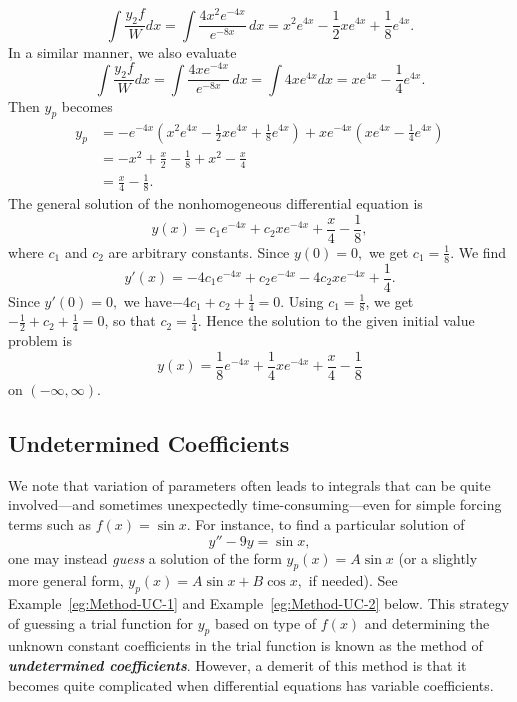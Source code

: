 \begin{solution}
\[
\int \frac{y_2 f}{W} dx= \int \frac{4x^2 e^{-4x}}{e^{-8x}}\, dx =x^2 e^{4x} - \frac{1}{2} x e^{4x} + \frac{1}{8} e^{4x}.\]
	In a similar manner, we also evaluate
		\[
		 \int \frac{y_2 f}{W} dx=\int \frac{4x e^{-4x}}{e^{-8x}}\, dx= \int 4x e^{4x} dx 
		= x e^{4x} - \frac{1}{4} e^{4x}.
		\]	
Then  \( y_p \) becomes
		\[\begin{aligned}
		y_p &= -e^{-4x} \left( x^2 e^{4x} - \frac{1}{2} x e^{4x} + \frac{1}{8} e^{4x} \right)
		+ x e^{-4x}\left( x e^{4x} - \frac{1}{4} e^{4x} \right)\\
		&=- x^2 + \frac{x}{2}  - \frac{1}{8} + x^2 - \frac{x}{4}\\
		 &=\frac{x}{4}  - \frac{1}{8}.
		\end{aligned}
		\]
The general solution of the nonhomogeneous differential equation  is
		\[
		y(x) = c_1 e^{-4x} + c_2 x e^{-4x} + \frac{x}{4} - \frac{1}{8},
		\]
	where $c_1$ and $c_2$ are arbitrary constants.	
	Since \(y(0) = 0,\) we get
		 \(c_1 = \frac{1}{8}.\)
	We find
		\[
		y'(x) = -4 c_1 e^{-4x} + c_2 e^{-4x} - 4 c_2 x e^{-4x} + \frac{1}{4}.\]
	Since
		\(y'(0) =0,\) we have\( -4 c_1 + c_2 + \frac{1}{4} = 0.\)
	Using $c_1= \frac{1}{8}$, we get
		\(
		-\frac{1}{2} + c_2 + \frac{1}{4} = 0\), so that 
	\(
		c_2 = \frac{1}{4}.
		\)
Hence the solution to the given initial value problem is 
		\[
	y(x) = \frac{1}{8} e^{-4x} + \frac{1}{4} x e^{-4x} + \frac{x}{4}  - \frac{1}{8} 
		\]
		 on $(-\infty, \infty).$
\end{solution}

\subsection{Undetermined Coefficients}\label{subsec:undertermined-coefficients}

We note that variation of parameters often leads to integrals that can be quite involved—and sometimes unexpectedly time-consuming—even for simple forcing terms such as \( f(x) = \sin x \). For instance, to find a particular solution of
\[
y'' - 9y = \sin x,
\]
one may instead \textit{guess} a solution of the form \( y_p(x) = A\sin x \) (or a slightly more general form, \( y_p(x) = A\sin x +B\cos x,\)  if needed). See Example~\ref{eg:Method-UC-1} and Example~\ref{eg:Method-UC-2} below.  This strategy of guessing a  trial function for $y_p$ based on type of \( f(x) \) and determining the unknown constant coefficients in the trial function is known as the method of  \textbf{\textit{undetermined coefficients}}.
However, a demerit of this method is that it becomes quite complicated when differential equations has variable coefficients.
 
